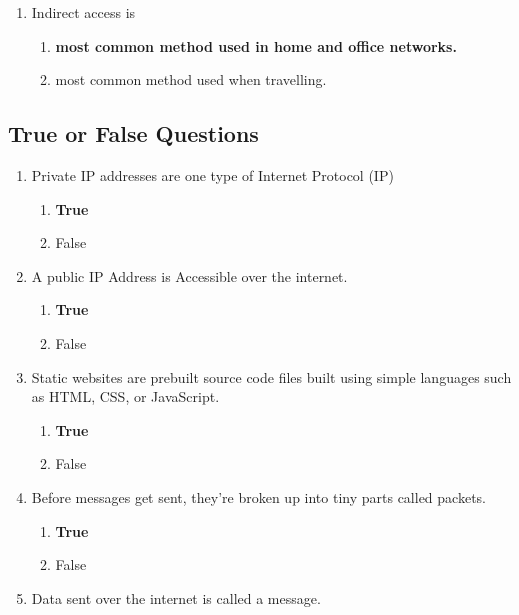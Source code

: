 \documentclass{article}
\begin{document}
\begin{enumerate}[label=\arabic*.]
    \item Indirect access is
        \begin{enumerate}
            \item \textbf{most common method used in home and office networks.}
            \item most common method used when travelling.
        \end{enumerate}
    
    
    


\end{enumerate}
\subsection*{True or False Questions}

\begin{enumerate}[label=\arabic*.]
    \item Private IP addresses are one type of Internet Protocol (IP)
          \begin{enumerate}
              \item \textbf{True}
              \item False
          \end{enumerate}
    \item A public IP Address is Accessible over the internet.
          \begin{enumerate}
              \item \textbf{True}
              \item False
          \end{enumerate}
    \item Static websites are prebuilt source code files built using simple languages such as HTML, CSS, or JavaScript.
            \begin{enumerate}
                \item \textbf{True}
                \item False
            \end{enumerate}
    \item Before messages get sent, they're broken up into tiny parts called packets.
          \begin{enumerate}
              \item \textbf{True}
              \item False
          \end{enumerate}
    \item Data sent over the internet is called a message.

\end{enumerate}
\end{document}
